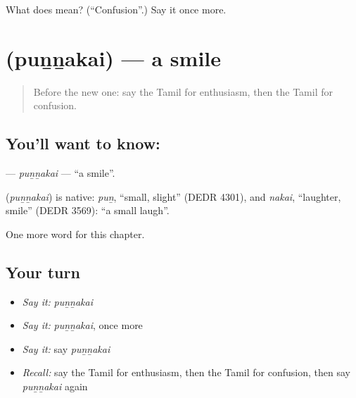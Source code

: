\begin{tcolorbox}[breakable,colback=teal!4,colframe=teal!35!black,title={Before you move on}]
What does  mean? (\textquotedblleft{}Confusion\textquotedblright{}.) Say it once more.
\end{tcolorbox}
\section[\texorpdfstring{\ta{புன்னகை} (puṉṉakai)}{புன்னகை (puṉṉakai)}]{ (puṉṉakai) — a smile}

\label{lesson:TA-C268-punnakai}



\begin{quote}
Before the new one: say the Tamil for enthusiasm, then the Tamil for confusion.
\end{quote}

\subsection*{You'll want to know: }
\textbf{} — \emph{puṉṉakai} — \textquotedblleft{}a smile\textquotedblright{}.

\begin{cousinweb}
\textbf{} (\emph{puṉṉakai}) is native: \emph{puṉ}, \textquotedblleft{}small, slight\textquotedblright{} (DEDR 4301), and \emph{nakai}, \textquotedblleft{}laughter, smile\textquotedblright{} (DEDR 3569): \textquotedblleft{}a small laugh\textquotedblright{}.
\end{cousinweb}

\begin{grammarlens}[title={What you've built}]
One more word for this chapter.
\end{grammarlens}

\subsection*{Your turn}
\begin{itemize}
\raggedright
  \item \emph{Say it:} \emph{puṉṉakai}
  \item \emph{Say it:} \emph{puṉṉakai}, once more
  \item \emph{Say it:} say \emph{puṉṉakai}
  \item \emph{Recall:} say the Tamil for enthusiasm, then the Tamil for confusion, then say \emph{puṉṉakai} again
\end{itemize}

